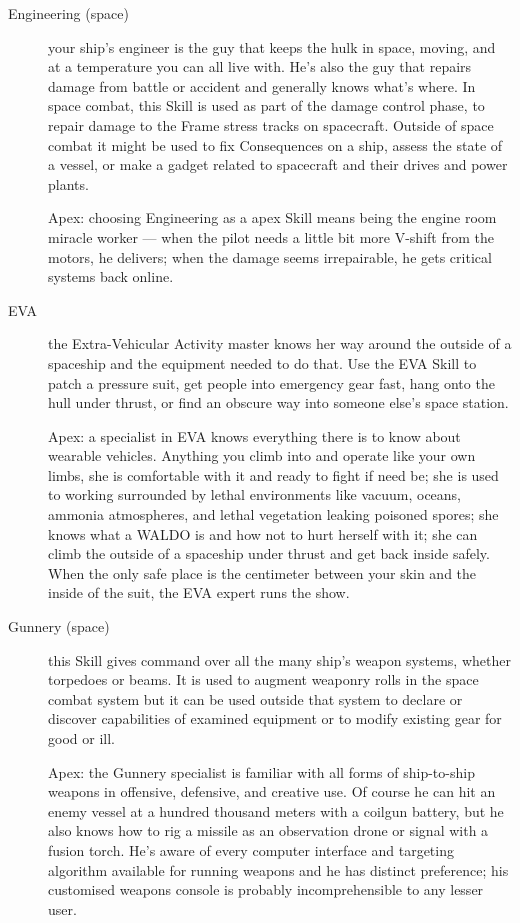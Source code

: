 \begin{description}
\item[Engineering (space)]
your ship's engineer is the guy that keeps the hulk in space, moving, and at a temperature you can all live with. He's also the guy that repairs damage from battle or accident and generally knows what's where. In space combat, this Skill is used as part of the damage control phase, to repair damage to the Frame stress tracks on spacecraft. Outside of space combat it might be used to fix Consequences on a ship, assess the state of a vessel, or make a gadget related to spacecraft and their drives and power plants.

Apex: choosing Engineering as a apex Skill means being the engine room miracle worker --- when the pilot needs a little bit more V-shift from the motors, he delivers; when the damage seems irrepairable, he gets critical systems back online.

\item[EVA]
the Extra-Vehicular Activity master knows her way around the outside of a spaceship and the equipment needed to do that. Use the EVA Skill to patch a pressure suit, get people into emergency gear fast, hang onto the hull under thrust, or find an obscure way into someone else's space station.

Apex: a specialist in EVA knows everything there is to know about wearable vehicles. Anything you climb into and operate like your own limbs, she is comfortable with it and ready to fight if need be; she is used to working surrounded by lethal environments like vacuum, oceans, ammonia atmospheres, and lethal vegetation leaking poisoned spores; she knows what a WALDO is and how not to hurt herself with it; she can climb the outside of a spaceship under thrust and get back inside safely. When the only safe place is the centimeter between your skin and the inside of the suit, the EVA expert runs the show.

\item[Gunnery (space)]
this Skill gives command over all the many ship's weapon systems, whether torpedoes or beams. It is used to augment weaponry rolls in the space combat system but it can be used outside that system to declare or discover capabilities of examined equipment or to modify existing gear for good or ill.

Apex: the Gunnery specialist is familiar with all forms of ship-to-ship weapons in offensive, defensive, and creative use. Of course he can hit an enemy vessel at a hundred thousand meters with a coilgun battery, but he also knows how to rig a missile as an observation drone or signal with a fusion torch. He's aware of every computer interface and targeting algorithm available for running weapons and he has distinct preference; his customised weapons console is probably incomprehensible to any lesser user.


\end{description}
